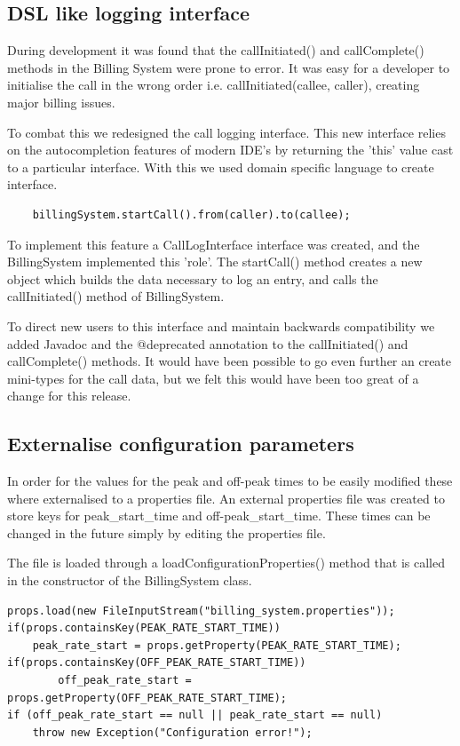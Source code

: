 \documentclass[pdftex,11pt,a4paper]{article}
\begin{document}
\subsection{DSL like logging interface}
During development it was found that the callInitiated() and callComplete() methods in the Billing System were prone to error. It was easy for a developer to initialise the call in the wrong order i.e. callInitiated(callee, caller), creating major billing issues.

To combat this we redesigned the call logging interface. This new interface relies on the autocompletion features of modern IDE's by returning the 'this' value cast to a particular interface. With this we used domain specific language to create interface.
\begin{lstlisting}
	billingSystem.startCall().from(caller).to(callee);
\end{lstlisting}
To implement this feature a CallLogInterface interface was created, and the BillingSystem implemented this 'role'. The startCall() method creates a new object which builds the data necessary to log an entry, and calls the callInitiated() method of BillingSystem.

To direct new users to this interface and maintain backwards compatibility we added Javadoc and the @deprecated annotation to the callInitiated()  and callComplete() methods. It would have been possible to go even further an create mini-types for the call data, but we felt this would have been too great of a change for this release.

\subsection{Externalise configuration parameters}
In order for the values for the peak and off-peak times to be easily modified these where externalised to a properties file. An external properties file was created to store keys for peak\_start\_time and off-peak\_start\_time. These times can be changed in the future simply by editing the properties file.

The file is loaded through a loadConfigurationProperties() method that is called in the constructor of the BillingSystem class. 

\begin{lstlisting}
props.load(new FileInputStream("billing_system.properties"));
if(props.containsKey(PEAK_RATE_START_TIME))
	peak_rate_start = props.getProperty(PEAK_RATE_START_TIME);
if(props.containsKey(OFF_PEAK_RATE_START_TIME))
     	off_peak_rate_start = props.getProperty(OFF_PEAK_RATE_START_TIME);
if (off_peak_rate_start == null || peak_rate_start == null)
	throw new Exception("Configuration error!");	
\end{lstlisting}
\end{document}
